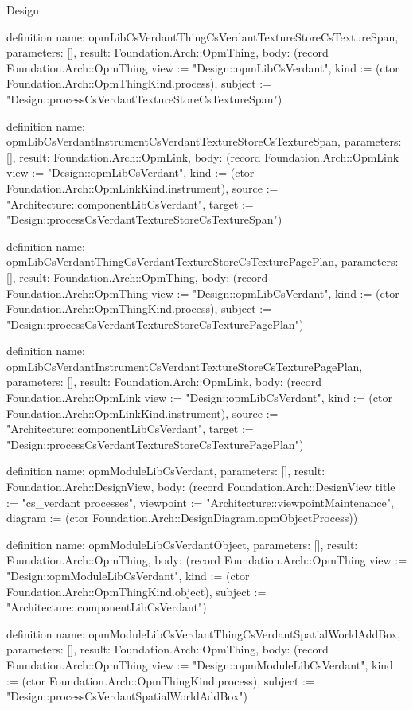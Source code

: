 \begin{lexlean}{Design}
\begin{semanticmodule}
definition{
  name: opmLibCsVerdantThingCsVerdantTextureStoreCsTextureSpan,
  parameters: [],
  result: Foundation.Arch::OpmThing,
  body: (record Foundation.Arch::OpmThing {view := "Design::opmLibCsVerdant", kind := (ctor Foundation.Arch::OpmThingKind.process), subject := "Design::processCsVerdantTextureStoreCsTextureSpan"})
}

definition{
  name: opmLibCsVerdantInstrumentCsVerdantTextureStoreCsTextureSpan,
  parameters: [],
  result: Foundation.Arch::OpmLink,
  body: (record Foundation.Arch::OpmLink {view := "Design::opmLibCsVerdant", kind := (ctor Foundation.Arch::OpmLinkKind.instrument), source := "Architecture::componentLibCsVerdant", target := "Design::processCsVerdantTextureStoreCsTextureSpan"})
}

definition{
  name: opmLibCsVerdantThingCsVerdantTextureStoreCsTexturePagePlan,
  parameters: [],
  result: Foundation.Arch::OpmThing,
  body: (record Foundation.Arch::OpmThing {view := "Design::opmLibCsVerdant", kind := (ctor Foundation.Arch::OpmThingKind.process), subject := "Design::processCsVerdantTextureStoreCsTexturePagePlan"})
}

definition{
  name: opmLibCsVerdantInstrumentCsVerdantTextureStoreCsTexturePagePlan,
  parameters: [],
  result: Foundation.Arch::OpmLink,
  body: (record Foundation.Arch::OpmLink {view := "Design::opmLibCsVerdant", kind := (ctor Foundation.Arch::OpmLinkKind.instrument), source := "Architecture::componentLibCsVerdant", target := "Design::processCsVerdantTextureStoreCsTexturePagePlan"})
}

definition{
  name: opmModuleLibCsVerdant,
  parameters: [],
  result: Foundation.Arch::DesignView,
  body: (record Foundation.Arch::DesignView {title := "cs_verdant processes", viewpoint := "Architecture::viewpointMaintenance", diagram := (ctor Foundation.Arch::DesignDiagram.opmObjectProcess)})
}

definition{
  name: opmModuleLibCsVerdantObject,
  parameters: [],
  result: Foundation.Arch::OpmThing,
  body: (record Foundation.Arch::OpmThing {view := "Design::opmModuleLibCsVerdant", kind := (ctor Foundation.Arch::OpmThingKind.object), subject := "Architecture::componentLibCsVerdant"})
}

definition{
  name: opmModuleLibCsVerdantThingCsVerdantSpatialWorldAddBox,
  parameters: [],
  result: Foundation.Arch::OpmThing,
  body: (record Foundation.Arch::OpmThing {view := "Design::opmModuleLibCsVerdant", kind := (ctor Foundation.Arch::OpmThingKind.process), subject := "Design::processCsVerdantSpatialWorldAddBox"})
}


\end{semanticmodule}
\end{lexlean}
